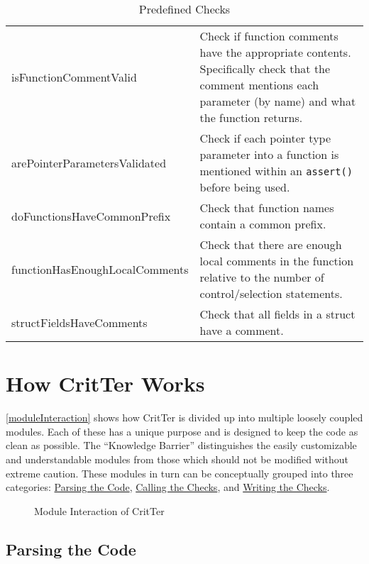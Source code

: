 \documentclass[12pt]{report}
\newcommand{\programName}{CritTer\xspace}
\begin{document}
\begin{table}
\begin{center}
\begin{tabular}{l p{9cm}}
		isFunctionCommentValid & Check if function comments have the appropriate contents. Specifically check that the comment mentions each parameter (by name) and what the function returns. \\
		arePointerParametersValidated & Check if each pointer type parameter into a function is mentioned within an \lstinline!assert()! before being used. \\
		doFunctionsHaveCommonPrefix & Check that function names contain a common prefix. \\
		functionHasEnoughLocalComments & Check that there are enough local comments in the function relative to the number of control/selection statements. \\
		structFieldsHaveComments & Check that all fields in a struct have a comment. \\
		\bottomrule
	\end{tabular}
	\end{center}
\caption{Predefined Checks}
\label{predefinedChecks}
\end{table}

\chapter{How \programName Works}
\label{howItWorks}

\autoref{moduleInteraction} shows how \programName is divided up into multiple loosely coupled 
modules. Each of these has a unique purpose and is designed to keep the code as clean as possible. 
The ``Knowledge Barrier'' distinguishes the easily customizable and understandable modules from 
those which should not be modified without extreme caution. These modules in turn can be 
conceptually grouped into three categories: \hyperref[parsingTheCode]{Parsing the Code}, 
\hyperref[callingTheChecks]{Calling the Checks}, and 
\hyperref[writingTheChecks]{Writing the Checks}.

\begin{figure}[h!]
\begin{center}
\end{center}
\caption{Module Interaction of \programName}
\label{moduleInteraction}
\end{figure}

\section{Parsing the Code}
\label{parsingTheCode}
\end{document}
